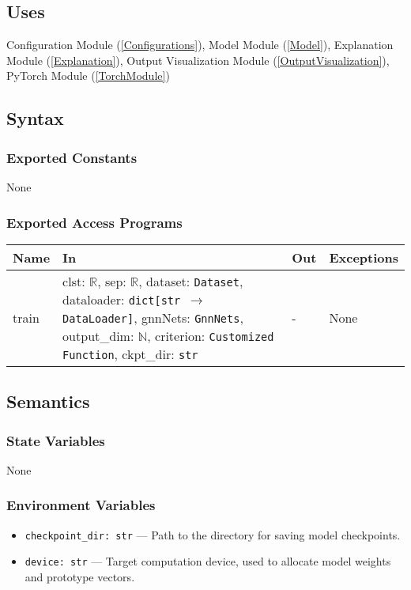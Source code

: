 \documentclass[12pt, titlepage]{article}
\begin{document}
\subsection{Uses}
Configuration Module (\ref{Configurations}), Model Module (\ref{Model}), Explanation Module (\ref{Explanation}), Output Visualization Module (\ref{OutputVisualization}), PyTorch Module (\ref{TorchModule})

\subsection{Syntax}

\subsubsection{Exported Constants}
None

\subsubsection{Exported Access Programs}
\begin{center}
\begin{tabular}{p{2.5cm} >{\raggedright\arraybackslash}p{6.2cm} p{4cm} p{3cm}}
\hline
\textbf{Name} & \textbf{In} & \textbf{Out} & \textbf{Exceptions} \\
\hline
train & clst: \(\mathbb{R}\), sep: \(\mathbb{R}\), dataset: \texttt{Dataset}, dataloader: \texttt{dict[str $\rightarrow$ DataLoader]}, gnnNets: \texttt{GnnNets}, output\_dim: \(\mathbb{N}\), criterion: \texttt{Customized Function}, ckpt\_dir: \texttt{str} & - & None \\
\hline
\end{tabular}
\end{center}

\subsection{Semantics}

\subsubsection{State Variables}
None

\subsubsection{Environment Variables}
\begin{itemize}
  \item \texttt{checkpoint\_dir: str} — Path to the directory for saving model checkpoints.
  \item \texttt{device: str} — Target computation device, used to allocate model weights and prototype vectors.
\end{itemize}
\end{document}
